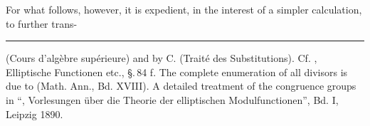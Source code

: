 For what follows, however, it is expedient, in the interest of a simpler calculation, to further trans-

\bigskip
\hrule
\bigskip

 (Cours d'alg\`ebre supérieure) and by C.  (Traité des Substitutions). Cf. , Elliptische Functionen etc., \S.\,84 f. The complete enumeration of all divisors is due to  (Math. Ann., Bd. XVIII). A detailed treatment of the congruence groups in ``, Vorlesungen über die Theorie der elliptischen Modulfunctionen'', Bd. I, Leipzig 1890.
